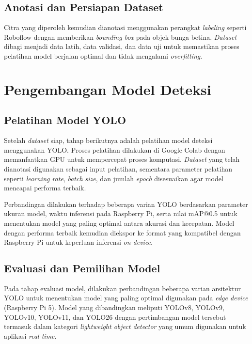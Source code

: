 \subsection{Anotasi dan Persiapan Dataset}
\label{subsec:anotasi-persiapan-dataset}

Citra yang diperoleh kemudian dianotasi menggunakan perangkat \emph{labeling} seperti Roboflow dengan memberikan \emph{bounding box} pada objek bunga betina. \emph{Dataset} dibagi menjadi data latih, data validasi, dan data uji untuk memastikan proses pelatihan model berjalan optimal dan tidak mengalami \emph{overfitting}.


\section{Pengembangan Model Deteksi}
\label{sec:pengembangan-model-deteksi}

\subsection{Pelatihan Model YOLO}
\label{subsec:pelatihan-model-yolo}

Setelah \emph{dataset} siap, tahap berikutnya adalah pelatihan model deteksi menggunakan YOLO. Proses pelatihan dilakukan di Google Colab dengan memanfaatkan GPU untuk mempercepat proses komputasi. \emph{Dataset} yang telah dianotasi digunakan sebagai input pelatihan, sementara parameter pelatihan seperti \emph{learning rate}, \emph{batch size}, dan jumlah \emph{epoch} disesuaikan agar model mencapai performa terbaik.

Perbandingan dilakukan terhadap beberapa varian YOLO berdasarkan parameter ukuran model, waktu inferensi pada Raspberry Pi, serta nilai mAP@0.5 untuk menentukan model yang paling optimal antara akurasi dan kecepatan. Model dengan performa terbaik kemudian diekspor ke format yang kompatibel dengan Raspberry Pi untuk keperluan inferensi \emph{on-device}.

\subsection{Evaluasi dan Pemilihan Model}
\label{subsec:evaluasi-pemilihan-model}

Pada tahap evaluasi model, dilakukan perbandingan beberapa varian arsitektur YOLO untuk menentukan model yang paling optimal digunakan pada \emph{edge device} (Raspberry Pi 5). Model yang dibandingkan meliputi YOLOv8, YOLOv9, YOLOv10, YOLOv11, dan YOLO26 dengan pertimbangan model tersebut termasuk dalam kategori \emph{lightweight object detector} yang umum digunakan untuk aplikasi \emph{real-time}.



